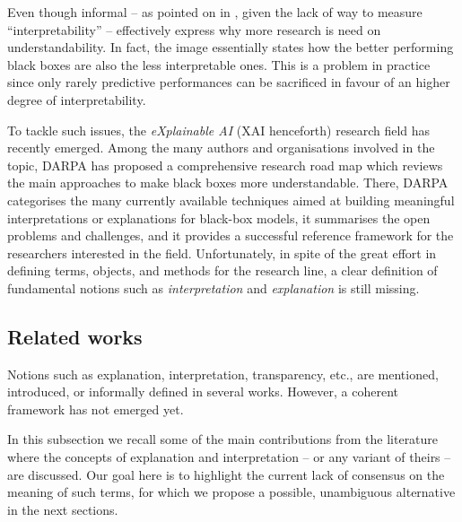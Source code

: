 \documentclass[12pt,a4paper,openright,twoside]{book}
\begin{document}
Even though informal -- as pointed on in \cite{Rudin2019}, given the lack of way to measure ``interpretability'' --  effectively express why more research is need on understandability.
%
In fact, the image essentially states how the better performing black boxes are also the less interpretable ones.
%
This is a problem in practice since only rarely predictive performances can be sacrificed in favour of an higher degree of interpretability.

To tackle such issues, the \emph{eXplainable AI} (XAI henceforth) research field has recently emerged.
%
Among the many authors and organisations involved in the topic, DARPA has proposed a comprehensive research road map \cite{darpa2016-xai} which reviews the main approaches to make black boxes more understandable.
%
There, DARPA categorises the many currently available techniques aimed at building meaningful interpretations or explanations for black-box models, it summarises the open problems and challenges, and it provides a successful reference framework for the researchers interested in the field.
%
Unfortunately, in spite of the great effort in defining terms, objects, and methods for the research line, a clear definition of fundamental notions such as \emph{interpretation} and \emph{explanation} is still missing.

\subsection{Related works}\label{ssec:related}

Notions such as explanation, interpretation, transparency, etc., are mentioned, introduced, or informally defined in several works.
%
However, a coherent framework has not emerged yet.

In this subsection we recall some of the main contributions from the literature where the concepts of explanation and interpretation -- or any variant of theirs -- are discussed.
%
Our goal here is to highlight the current lack of consensus on the meaning of such terms, for which we propose a possible, unambiguous alternative in the next sections.
\end{document}
